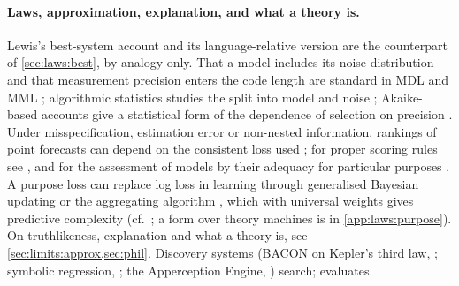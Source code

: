 \paragraph{Laws, approximation, explanation, and what a theory is.}
Lewis's best-system account \citep{lewis1983new,lewis1994humean} and its language-relative version \citep{cohen2009better} are the counterpart of \cref{sec:laws:best}, by analogy only. That a model includes its noise distribution and that measurement precision enters the code length are standard in MDL and MML \citep{rissanen1978modeling,wallace2005statistical,grunwald2007minimum}; algorithmic statistics studies the split into model and noise \citep{gacs2001algorithmic,vereshchagin2004kolmogorov}; Akaike-based accounts give a statistical form of the dependence of selection on precision \citep{forster1994how}. Under misspecification, estimation error or non-nested information, rankings of point forecasts can depend on the consistent loss used \citep{patton2020comparing}; for proper scoring rules see \citet{gneiting2007strictly}, and for the assessment of models by their adequacy for particular purposes \citet{parker2009confirmation,parker2020model}. A purpose loss can replace log loss in learning through generalised Bayesian updating \citep{bissiri2016general} or the aggregating algorithm \citep{vovk1990aggregating,vovk2001competitive}, which with universal weights gives predictive complexity (cf.\ \citealp{vovk1998universal}; a form over theory machines is in \cref{app:laws:purpose}). On truthlikeness, explanation and what a theory is, see \cref{sec:limits:approx,sec:phil}. Discovery systems (BACON on Kepler's third law, \citealp{langley1987scientific}; symbolic regression, \citealp{schmidt2009distilling,udrescu2020ai}; the Apperception Engine, \citealp{evans2021making}) search; \SAIabbr evaluates.

